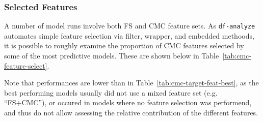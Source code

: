 \documentclass{article}
\begin{document}
\subsubsection{Selected Features}

A number of model runs involve both FS and CMC feature sets. As \texttt{df-analyze}
automates simple feature selection via filter, wrapper, and embedded
methoods, it is possible to roughly examine the proportion of CMC features
selected by some of the most predictive models. These are shown below in
Table~\ref{tab:cmc-feature-select}.

Note that performances are lower than in
Table~\ref{tab:cmc-target-feat-best}, as the best performing models usually
did not use a mixed feature set (e.g. ``FS+CMC''), or occured in models where
no feature selection was performend, and thus do not allow assessing the
relative contribution of the different features.
\end{document}
